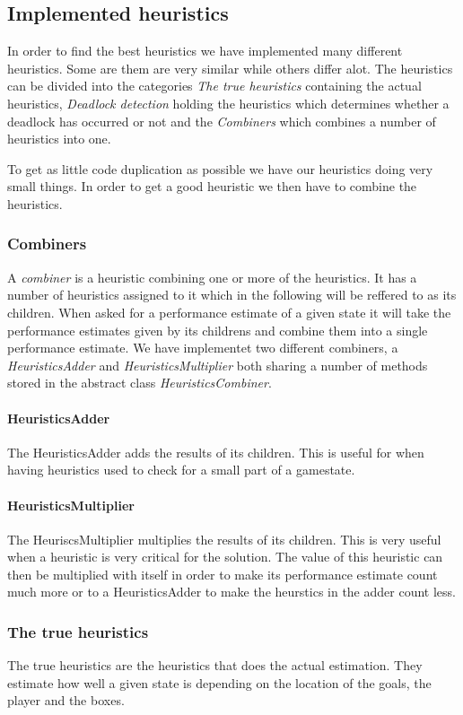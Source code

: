\subsection{Implemented heuristics}
In order to find the best heuristics we have implemented many different heuristics. Some are them are very similar while others differ alot. The heuristics can be divided into the categories \textit{The true heuristics} containing the actual heuristics, \textit{Deadlock detection} holding the heuristics which determines whether a deadlock has occurred or not and the \textit{Combiners} which combines a number of heuristics into one.

To get as little code duplication as possible we have our heuristics doing very small things. In order to get a good heuristic we then have to combine the heuristics.

\subsubsection{Combiners}
A \textit{combiner} is a heuristic combining one or more of the heuristics. It has a number of heuristics assigned to it which in the following will be reffered to as its children. When asked for a performance estimate of a given state it will take the performance estimates given by its childrens and combine them into a single performance estimate.
We have implementet two different combiners, a \textit{HeuristicsAdder} and \textit{HeuristicsMultiplier} both sharing a number of methods stored in the abstract class \textit{HeuristicsCombiner}.
\paragraph{HeuristicsAdder}The HeuristicsAdder adds the results of its children. This is useful for when having heuristics used to check for a small part of a gamestate. 
\paragraph{HeuristicsMultiplier}The HeuriscsMultiplier multiplies the results of its children. This is very useful when a heuristic is very critical for the solution. The value of this heuristic can then be multiplied with itself in order to make its performance estimate count much more or to a HeuristicsAdder to make the heurstics in the adder count less.

\subsubsection{The true heuristics}
The true heuristics are the heuristics that does the actual estimation. They estimate how well a given state is depending on the location of the goals, the player and the boxes.


